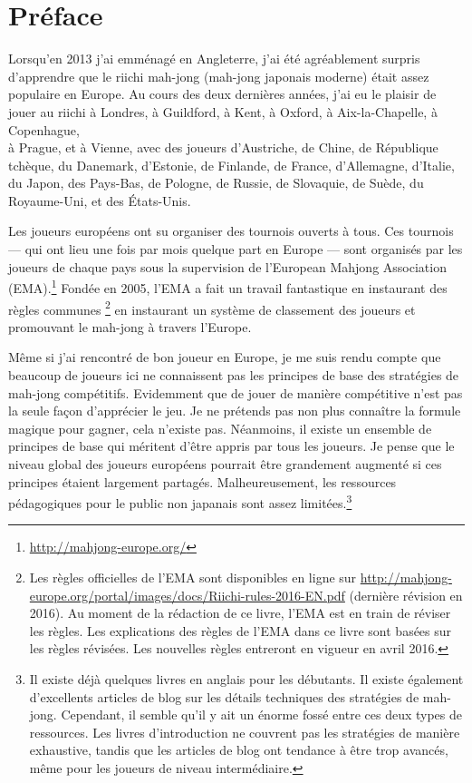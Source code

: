 \chapter{Préface}
\thispagestyle{empty}

Lorsqu'en 2013 j'ai emménagé en Angleterre, j'ai été agréablement surpris d'apprendre que le riichi mah-jong (mah-jong japonais moderne) était assez populaire en Europe. Au cours des deux dernières années, j'ai eu le plaisir de jouer au riichi à Londres, à Guildford, à Kent, à Oxford, à Aix-la-Chapelle, à Copenhague,\\
à Prague, et à Vienne, avec des joueurs d'Austriche, de Chine, de République tchèque, du Danemark, d'Estonie, de Finlande, de France, d'Allemagne, d'Italie, du Japon, des Pays-Bas, de Pologne, de Russie, de Slovaquie, de Suède, du Royaume-Uni, et des États-Unis.

\bigskip
Les joueurs européens ont su organiser des tournois ouverts à tous. Ces tournois --- qui ont lieu une fois par mois quelque part en Europe --- sont organisés par les joueurs de chaque pays sous la supervision de l'European Mahjong Association (EMA).\footnote{\url{http://mahjong-europe.org/}} 
Fondée en 2005, l'EMA a fait un travail fantastique en instaurant des règles communes%
\footnote{Les règles officielles de l'EMA sont disponibles en ligne sur \url{http://mahjong-europe.org/portal/images/docs/Riichi-rules-2016-EN.pdf} (dernière révision en 2016). Au moment de la rédaction de ce livre, l'EMA est en train de réviser les règles.
Les explications des règles de l'EMA dans ce livre sont basées sur les règles révisées. Les nouvelles règles entreront en vigueur en avril 2016.
}
en instaurant un système de classement des joueurs et promouvant le mah-jong à travers l'Europe. 

\bigskip
Même si j'ai rencontré de bon joueur en Europe, je me suis rendu compte que beaucoup de joueurs ici ne connaissent pas les principes de base des stratégies de mah-jong compétitifs. Evidemment que de jouer de manière compétitive n'est pas la seule façon d'apprécier le jeu.
Je ne prétends pas non plus connaître la formule magique pour gagner, cela n'existe pas. Néanmoins, il existe un ensemble de principes de base qui méritent d'être appris par tous les joueurs. Je pense que le niveau global des joueurs européens pourrait être grandement augmenté si ces principes étaient largement partagés. Malheureusement, les ressources pédagogiques pour le public non japanais sont assez limitées.\footnote{Il existe déjà quelques livres en anglais pour les débutants. Il existe également d'excellents articles de blog sur les détails techniques des stratégies de mah-jong. Cependant, il semble qu'il y ait un énorme fossé entre ces deux types de ressources. Les livres d'introduction ne couvrent pas les stratégies de manière exhaustive, tandis que les articles de blog ont tendance à être trop avancés, même pour les joueurs de niveau intermédiaire.}

